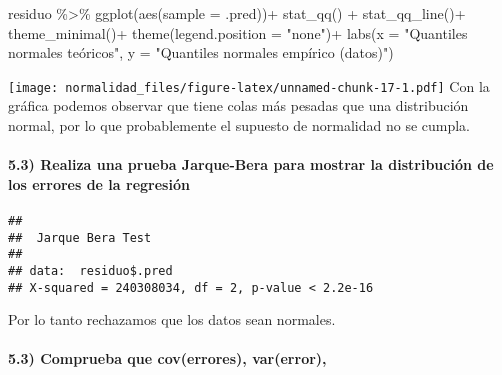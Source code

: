 \documentclass[
]{article}
\newenvironment{Shaded}{\begin{snugshade}}{\end{snugshade}}
\newcommand{\AttributeTok}[1]{\textcolor[rgb]{0.77,0.63,0.00}{#1}}
\newcommand{\FunctionTok}[1]{\textcolor[rgb]{0.00,0.00,0.00}{#1}}
\newcommand{\NormalTok}[1]{#1}
\newcommand{\SpecialCharTok}[1]{\textcolor[rgb]{0.00,0.00,0.00}{#1}}
\newcommand{\StringTok}[1]{\textcolor[rgb]{0.31,0.60,0.02}{#1}}
\begin{document}
\begin{Shaded}
\begin{Highlighting}[]
\NormalTok{residuo }\SpecialCharTok{\%\textgreater{}\%} 
  \FunctionTok{ggplot}\NormalTok{(}\FunctionTok{aes}\NormalTok{(}\AttributeTok{sample =}\NormalTok{ .pred))}\SpecialCharTok{+}
  \FunctionTok{stat\_qq}\NormalTok{() }\SpecialCharTok{+} \FunctionTok{stat\_qq\_line}\NormalTok{()}\SpecialCharTok{+}
  \FunctionTok{theme\_minimal}\NormalTok{()}\SpecialCharTok{+}
  \FunctionTok{theme}\NormalTok{(}\AttributeTok{legend.position =} \StringTok{"none"}\NormalTok{)}\SpecialCharTok{+}
  \FunctionTok{labs}\NormalTok{(}\AttributeTok{x =} \StringTok{"Quantiles normales teóricos"}\NormalTok{,}
       \AttributeTok{y =} \StringTok{"Quantiles normales empírico (datos)"}\NormalTok{)}
\end{Highlighting}
\end{Shaded}

\texttt{[image: normalidad\_files/figure-latex/unnamed-chunk-17-1.pdf]}
Con la gráfica podemos observar que tiene colas más pesadas que una
distribución normal, por lo que probablemente el supuesto de normalidad
no se cumpla.

\hypertarget{realiza-una-prueba-jarque-bera-para-mostrar-la-distribuciuxf3n-de-los-errores-de-la-regresiuxf3n}{%
\paragraph{5.3) Realiza una prueba Jarque-Bera para mostrar la
distribución de los errores de la
regresión}\label{realiza-una-prueba-jarque-bera-para-mostrar-la-distribuciuxf3n-de-los-errores-de-la-regresiuxf3n}}

\begin{Shaded}
\end{Shaded}

\begin{verbatim}
## 
##  Jarque Bera Test
## 
## data:  residuo$.pred
## X-squared = 240308034, df = 2, p-value < 2.2e-16
\end{verbatim}

Por lo tanto rechazamos que los datos sean normales.

\hypertarget{comprueba-que-coverrores-varerror}{%
\paragraph{5.3) Comprueba que cov(errores),
var(error),}\label{comprueba-que-coverrores-varerror}}
\end{document}
